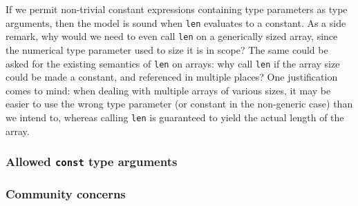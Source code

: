 If we permit non-trivial constant expressions containing type parameters as type
arguments, then the model is sound when \texttt{len} evaluates to a constant. As
a side remark, why would we need to even call \texttt{len} on a generically
sized array, since the numerical type parameter used to size it is in scope? The
same could be asked for the existing semantics of \texttt{len} on arrays: why
call \texttt{len} if the array size could be made a constant, and referenced in
multiple places? One justification comes to mind: when dealing with multiple
arrays of various sizes, it may be easier to use the wrong type parameter (or
constant in the non-generic case) than we intend to, whereas calling
\texttt{len} is guaranteed to yield the actual length of the array.



\subsubsection{Allowed \texttt{const} type arguments}



\subsubsection{Community concerns}
